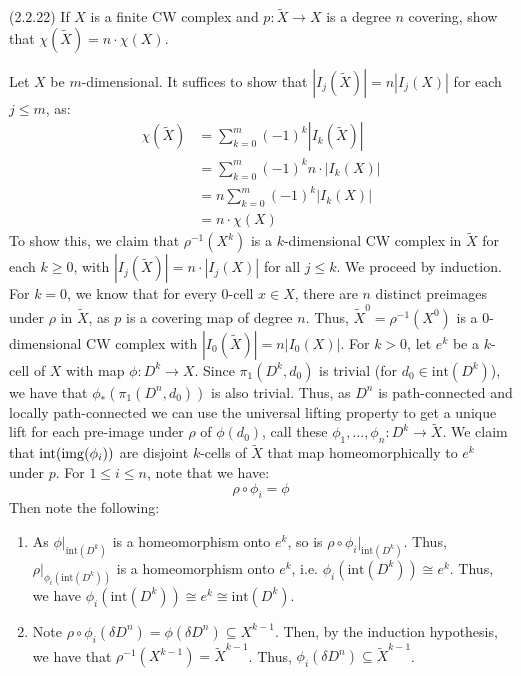 \documentclass[12pt]{article}
\begin{document}
\begin{problem}{4}(2.2.22) 
    If $X$ is a finite CW complex and $p \colon \widetilde{X} \to X$ is a degree $n$ covering, show that $\chi(\widetilde{X}) = n \cdot \chi(X)$. 
\end{problem}
\begin{solution}
    Let $X$ be $m$-dimensional. It suffices to show that $|I_j(\widetilde{X})| = n |I_j(X)|$ for each $j \leq m$, as: 
    \begin{align*}
    \chi(\widetilde{X}) &= \sum_{k=0}^m (-1)^k |I_k(\widetilde{X})| \\
    &= \sum_{k=0}^m (-1)^k n \cdot |I_k(X)| \\
    &= n \sum_{k=0}^m (-1)^k |I_k(X)| \\
    &= n \cdot \chi(X)
    \end{align*}
    To show this, we claim that $\rho^{-1}(X^{k})$ is a $k$-dimensional CW complex in $\widetilde{X}$ for each $k \geq 0$, with $|I_j(\widetilde X)| = n \cdot |I_j(X)|$ for all $j \leq k$. We proceed by induction. \bbni
    For $k = 0$, we know that for every $0$-cell $x \in X$, there are $n$ distinct preimages under $\rho$ in $\widetilde{X}$, as $p$ is a covering map of degree $n$. Thus, $\widetilde{X}^0 = \rho^{-1}(X^0)$ is a $0$-dimensional CW complex with $|I_0(\widetilde{X})| = n |I_0(X)|$. \bbni
    For $k > 0$, let $e^k$ be a $k$-cell of $X$ with map $\phi: D^k \to X$. Since $\pi_1(D^k, d_0)$ is trivial (for $d_0 \in \text{int}(D^k)$), we have that $\phi_{*}(\pi_1(D^n, d_0))$ is also trivial. Thus, as $D^n$ is path-connected and locally path-connected we can use the universal lifting property to get a unique lift for each pre-image under $\rho$ of $\phi(d_0)$, call these $\phi_1, \ldots, \phi_n: D^k \to \widetilde{X}$. We claim that $\text{int}(\operatorname{img}(\phi_i))$ are disjoint $k$-cells of $\widetilde{X}$ that map homeomorphically to $e^k$ under $p$. \bbni
    For $1 \leq i \leq n$, note that we have: 
    \[ \rho \circ \phi_i = \phi\]
    Then note the following:
    \begin{enumerate}
        \item As $\phi|_{\text{int}(D^k)}$ is a homeomorphism onto $e^k$, so is $\rho \circ \phi_i|_{\text{int}(D^k)}$. Thus, $\rho|_{\phi_i(\text{int}(D^k))}$ is a homeomorphism onto $e^k$, i.e. $\phi_i(\text{int}(D^k)) \cong e^k$. Thus, we have $\phi_i(\text{int}(D^k)) \cong e^k \cong \text{int}(D^k)$.
        \item Note $\rho \circ \phi_i(\delta D^n) = \phi(\delta D^n) \subseteq X^{k-1}$. Then, by the induction hypothesis, we have that $\rho^{-1}(X^{k-1}) = \widetilde{X}^{k-1}$. Thus, $\phi_i(\delta D^n) \subseteq \widetilde{X}^{k-1}$. 

\end{enumerate}
\end{solution}
\end{document}
